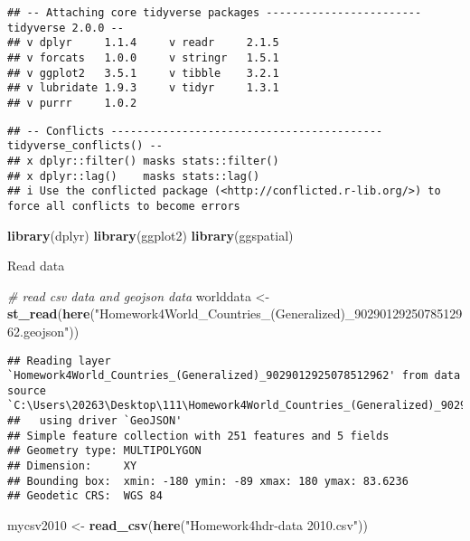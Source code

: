\documentclass[
]{article}
\newenvironment{Shaded}{\begin{snugshade}}{\end{snugshade}}
\newcommand{\CommentTok}[1]{\textcolor[rgb]{0.56,0.35,0.01}{\textit{#1}}}
\newcommand{\FunctionTok}[1]{\textcolor[rgb]{0.13,0.29,0.53}{\textbf{#1}}}
\newcommand{\NormalTok}[1]{#1}
\newcommand{\OtherTok}[1]{\textcolor[rgb]{0.56,0.35,0.01}{#1}}
\newcommand{\StringTok}[1]{\textcolor[rgb]{0.31,0.60,0.02}{#1}}
\begin{document}
\begin{verbatim}
## -- Attaching core tidyverse packages ------------------------ tidyverse 2.0.0 --
## v dplyr     1.1.4     v readr     2.1.5
## v forcats   1.0.0     v stringr   1.5.1
## v ggplot2   3.5.1     v tibble    3.2.1
## v lubridate 1.9.3     v tidyr     1.3.1
## v purrr     1.0.2
\end{verbatim}

\begin{verbatim}
## -- Conflicts ------------------------------------------ tidyverse_conflicts() --
## x dplyr::filter() masks stats::filter()
## x dplyr::lag()    masks stats::lag()
## i Use the conflicted package (<http://conflicted.r-lib.org/>) to force all conflicts to become errors
\end{verbatim}

\begin{Shaded}
\begin{Highlighting}[]
\FunctionTok{library}\NormalTok{(dplyr)}
\FunctionTok{library}\NormalTok{(ggplot2)}
\FunctionTok{library}\NormalTok{(ggspatial) }
\end{Highlighting}
\end{Shaded}

Read data

\begin{Shaded}
\begin{Highlighting}[]
\CommentTok{\# read csv data and geojson data}
\NormalTok{worlddata }\OtherTok{\textless{}{-}} \FunctionTok{st\_read}\NormalTok{(}\FunctionTok{here}\NormalTok{(}\StringTok{"Homework4World\_Countries\_(Generalized)\_9029012925078512962.geojson"}\NormalTok{))}
\end{Highlighting}
\end{Shaded}

\begin{verbatim}
## Reading layer `Homework4World_Countries_(Generalized)_9029012925078512962' from data source `C:\Users\20263\Desktop\111\Homework4World_Countries_(Generalized)_9029012925078512962.geojson' 
##   using driver `GeoJSON'
## Simple feature collection with 251 features and 5 fields
## Geometry type: MULTIPOLYGON
## Dimension:     XY
## Bounding box:  xmin: -180 ymin: -89 xmax: 180 ymax: 83.6236
## Geodetic CRS:  WGS 84
\end{verbatim}

\begin{Shaded}
\begin{Highlighting}[]
\NormalTok{mycsv2010 }\OtherTok{\textless{}{-}}  \FunctionTok{read\_csv}\NormalTok{(}\FunctionTok{here}\NormalTok{(}\StringTok{"Homework4hdr{-}data 2010.csv"}\NormalTok{))}
\end{Highlighting}
\end{Shaded}
\end{document}
